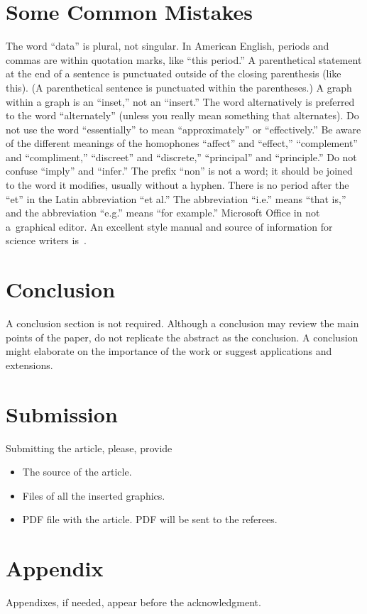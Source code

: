 \documentclass[a4paper,conference]{IEEEtran}
\begin{document}
\section{Some Common Mistakes}
The word ``data'' is plural, not singular.  In American English, periods and commas are within quotation marks, like ``this period.''  A parenthetical statement at the end of a sentence is punctuated outside of the closing parenthesis (like this).  (A parenthetical sentence is punctuated within the parentheses.)  A graph within a graph is an ``inset,'' not an ``insert.''  The word alternatively is preferred to the word ``alternately'' (unless you really mean something that alternates).  Do not use the word ``essentially'' to mean ``approximately'' or ``effectively.''  Be aware of the different meanings of the homophones ``affect'' and ``effect,'' ``complement'' and ``compliment,'' ``discreet'' and ``discrete,'' ``principal'' and ``principle.''  Do not confuse ``imply'' and ``infer.''  The prefix ``non'' is not a word; it should be joined to the word it modifies, usually without a hyphen.  There is no period after the ``et'' in the Latin abbreviation ``et al.''  The abbreviation ``i.e.'' means ``that is,'' and the abbreviation ``e.g.'' means ``for example.'' Microsoft Office in not a~graphical editor. An excellent style manual and source of information for science writers is~\cite{c7}.

\section{Conclusion}
A conclusion section is not required. Although a conclusion may review the main points of the paper, do not replicate the abstract as the conclusion. A conclusion might elaborate on the importance of the work or suggest applications and extensions. 

\section{Submission}
Submitting the article, please, provide
\begin{itemize}
\item The source of the article.
\item Files of all the inserted graphics.
\item PDF file with the article. PDF will be sent to the referees.
\end{itemize}

\section*{Appendix}
Appendixes, if needed, appear before the acknowledgment.
\end{document}
